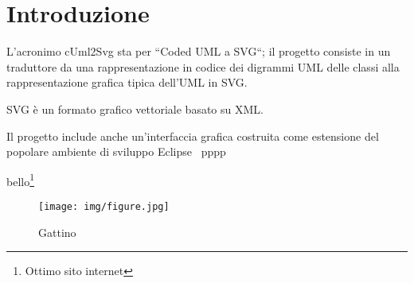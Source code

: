 \chapter{Introduzione}

L'acronimo cUml2Svg sta per ``Coded UML a SVG``; 
il progetto consiste in un traduttore da una rappresentazione
in codice dei digrammi UML delle classi alla rappresentazione grafica
tipica dell'UML in SVG.

SVG è un formato grafico vettoriale basato su XML.

Il progetto include anche un'interfaccia grafica costruita come estensione del
popolare ambiente di sviluppo Eclipse~\cite{eclipse_website} pppp~\cite{RSGD:1}

bello\footnote{Ottimo sito internet}

\begin{figure}[htp]
\begin{center}
  \texttt{[image: img/figure.jpg]}
  \caption[labelInTOC]{Gattino}
\end{center}
\end{figure}